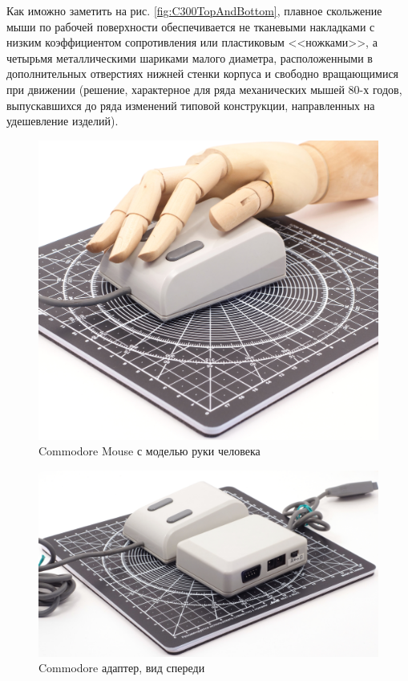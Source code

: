 \documentclass[11pt, a4paper]{article}
\begin{document}
Как иможно заметить на рис. \ref{fig:C300TopAndBottom}, плавное скольжение мыши по рабочей поверхности обеспечивается не тканевыми накладками с низким коэффициентом сопротивления или пластиковым <<ножками>>, а четырьмя металлическими шариками малого диаметра, расположенными в дополнительных отверстиях нижней стенки корпуса и свободно вращающимися при движении (решение, характерное для ряда механических мышей 80-х годов, выпускавшихся до ряда изменений типовой конструкции, направленных на удешевление изделий).

\begin{figure}[h]
    \centering
    \includegraphics[scale=0.3]{1986_commodore_c300_mouse/cmruka_30.jpg}
    \caption{Commodore Mouse с моделью руки человека}
    \label{fig:C300Hand}
\end{figure}

\begin{figure}[h]
    \centering
    \includegraphics[scale=0.3]{1986_commodore_c300_mouse/cmblock_30.jpg}
    \caption{Commodore адаптер, вид спереди}
    \label{fig:C300Block}
\end{figure}
\end{document}

